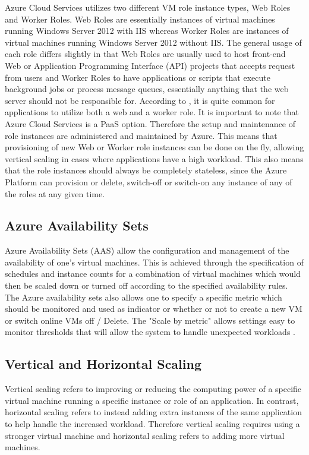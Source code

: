 Azure Cloud Services utilizes two different VM role instance types, Web Roles and Worker Roles. Web Roles are essentially instances of virtual machines running Windows Server 2012 with IIS whereas Worker Roles are instances of virtual machines running Windows Server 2012 without IIS. The general usage of each role differs slightly in that Web Roles are usually used to host front-end Web or Application Programming Interface (API) projects that accepts request from users and Worker Roles to have applications or scripts that execute background jobs or process message queues, essentially anything that the web server should not be responsible for. According to \cite{Microsoft_Corporation_undated-ej}, it is quite common for applications to utilize both a web and a worker role. It is important to note that Azure Cloud Services is a PaaS option. Therefore the setup and maintenance of role instances are administered and maintained by Azure. This means that provisioning of new Web or Worker role instances can be done on the fly, allowing vertical scaling in cases where applications have a high workload. This also means that the role instances should always be completely stateless, since the Azure Platform can provision or delete, switch-off or switch-on any instance of any of the roles at any given time.

\subsection{Azure Availability Sets}

Azure Availability Sets (AAS) allow the configuration and management of the availability of one's virtual machines. This is achieved through the specification of schedules and instance counts for a combination of virtual machines which would then be scaled down or turned off according to the specified availability rules. The Azure availability sets also allows one to specify a specific metric which should be monitored and used as indicator or whether or not to create a new VM or switch online VMs off / Delete. The "Scale by metric" allows settings easy to monitor thresholds that will allow the system to handle unexpected workloads \cite{Jelen2011}.

\subsection{Vertical and Horizontal Scaling}

Vertical scaling refers to improving or reducing the computing power of a specific virtual machine running a specific instance or role of an application. In contrast, horizontal scaling refers to instead adding extra instances of the same application to help handle the increased workload. Therefore vertical scaling requires using a stronger virtual machine and horizontal scaling refers to adding more virtual machines.
 
